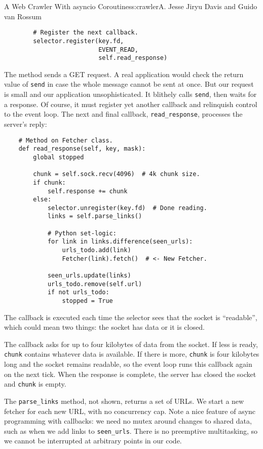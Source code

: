 \begin{aosachapter}{A Web Crawler With asyncio Coroutines}{s:crawler}{A. Jesse Jiryu Davis and Guido van Rossum}
\begin{verbatim}
        # Register the next callback.
        selector.register(key.fd,
                          EVENT_READ,
                          self.read_response)
\end{verbatim}

The method sends a GET request. A real application would check the
return value of \texttt{send} in case the whole message cannot be sent
at once. But our request is small and our application unsophisticated.
It blithely calls \texttt{send}, then waits for a response. Of course,
it must register yet another callback and relinquish control to the
event loop. The next and final callback, \texttt{read\_response},
processes the server's reply:

\begin{verbatim}
    # Method on Fetcher class.
    def read_response(self, key, mask):
        global stopped

        chunk = self.sock.recv(4096)  # 4k chunk size.
        if chunk:
            self.response += chunk
        else:
            selector.unregister(key.fd)  # Done reading.
            links = self.parse_links()
            
            # Python set-logic:
            for link in links.difference(seen_urls):
                urls_todo.add(link)
                Fetcher(link).fetch()  # <- New Fetcher.

            seen_urls.update(links)
            urls_todo.remove(self.url)
            if not urls_todo:
                stopped = True
\end{verbatim}

The callback is executed each time the selector sees that the socket is
``readable'', which could mean two things: the socket has data or it is
closed.

The callback asks for up to four kilobytes of data from the socket. If
less is ready, \texttt{chunk} contains whatever data is available. If
there is more, \texttt{chunk} is four kilobytes long and the socket
remains readable, so the event loop runs this callback again on the next
tick. When the response is complete, the server has closed the socket
and \texttt{chunk} is empty.

The \texttt{parse\_links} method, not shown, returns a set of URLs. We
start a new fetcher for each new URL, with no concurrency cap. Note a
nice feature of async programming with callbacks: we need no mutex
around changes to shared data, such as when we add links to
\texttt{seen\_urls}. There is no preemptive multitasking, so we cannot
be interrupted at arbitrary points in our code.


\end{aosachapter}

